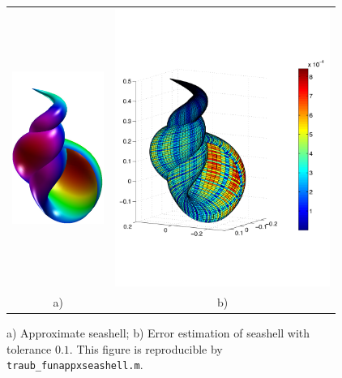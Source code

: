 \documentclass[review]{elsarticle}
\theoremstyle{definition}
\begin{document}
\begin{figure}[tbh]
  \centering
  \begin{tabular}{cc}
     \includegraphics[width=30mm]{figure/funappxseashell.pdf} 
  & \includegraphics[width=70mm]{figure/seashellsurferror.pdf}
  \\ a)  & b) 
  \end{tabular}
\caption{a) Approximate seashell; b) Error estimation of seashell with tolerance
$0.1$. This figure is reproducible by \texttt{traub\_funappxseashell.m}.}
\label{fig:funappxseashell}
\end{figure}
\end{document}
